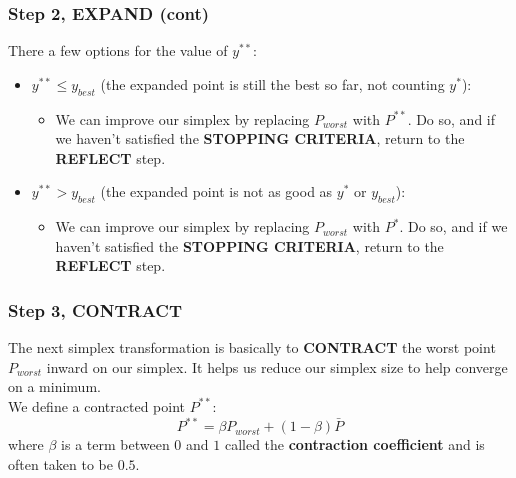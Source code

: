 \documentclass[aspectratio=169]{beamer}
\begin{document}
	\begin{frame}
		\frametitle{Step 2, EXPAND (cont)}
		There a few options for the value of $y^{**}$:\\[\baselineskip]
		\begin{itemize}
			\item $y^{**} \leq y_{best}$ (the expanded point is still the best so far, not counting $y^*$):
			\begin{itemize}
				\item We can improve our simplex by replacing $P_{worst}$ with $P^{**}$. Do so, and if we haven't satisfied the \textbf{STOPPING CRITERIA}, return to the \textbf{REFLECT} step.
			\end{itemize}
		\end{itemize}
		\begin{itemize}
		\item $y^{**}>y_{best}$ (the expanded point is not as good as $y^*$ or $y_{best}$):
		\begin{itemize}
			\item We can improve our simplex by replacing $P_{worst}$ with $P^{*}$. Do so, and if we haven't satisfied the \textbf{STOPPING CRITERIA}, return to the \textbf{REFLECT} step.
		\end{itemize}
	\end{itemize}
	\end{frame}

	\begin{frame}
		\frametitle{Step 3, CONTRACT}
		The next simplex transformation is basically to \textbf{CONTRACT} the worst point $P_{worst}$ inward on our simplex. It helps us reduce our simplex size to help converge on a minimum.
		\\[\baselineskip]
		We define a contracted point $P^{**}$:
		$$P^{**}=\beta P_{worst}+(1-\beta)\bar{P}$$
		where $\beta$ is a term between $0$ and $1$ called the \textbf{contraction coefficient} and is often taken to be $0.5$.
	\end{frame}
\end{document}
